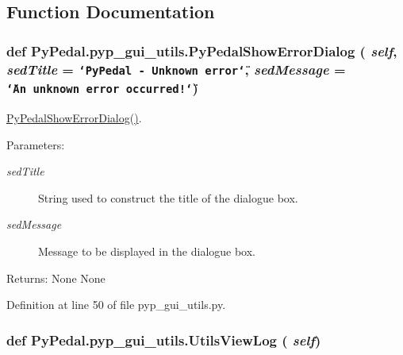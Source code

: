 \subsection{Function Documentation}
\hypertarget{namespacePyPedal_1_1pyp__gui__utils_eaf3878d1d73ab889e16f6224639685b}{
\subsubsection[PyPedalShowErrorDialog]{\setlength{\rightskip}{0pt plus 5cm}def Py\-Pedal.pyp\_\-gui\_\-utils.Py\-Pedal\-Show\-Error\-Dialog ( {\em self},  {\em sed\-Title} = {\tt \char`\"{}PyPedal~-~Unknown~error\char`\"{}},  {\em sed\-Message} = {\tt \char`\"{}An~unknown~error~occurred!\char`\"{}})}}
\label{namespacePyPedal_1_1pyp__gui__utils_eaf3878d1d73ab889e16f6224639685b}


\hyperlink{namespacePyPedal_1_1pyp__gui__utils_eaf3878d1d73ab889e16f6224639685b}{Py\-Pedal\-Show\-Error\-Dialog()}. 

\begin{Desc}
\item[Parameters:]
\begin{description}
\item[{\em sed\-Title}]String used to construct the title of the dialogue box. \item[{\em sed\-Message}]Message to be displayed in the dialogue box. \end{description}
\end{Desc}
\begin{Desc}
\item[Returns:]None  None \end{Desc}


Definition at line 50 of file pyp\_\-gui\_\-utils.py.\hypertarget{namespacePyPedal_1_1pyp__gui__utils_4506364150a4d59d9fd5154c1e40a029}{
\subsubsection[UtilsViewLog]{\setlength{\rightskip}{0pt plus 5cm}def Py\-Pedal.pyp\_\-gui\_\-utils.Utils\-View\-Log ( {\em self})}}
\label{namespacePyPedal_1_1pyp__gui__utils_4506364150a4d59d9fd5154c1e40a029}



